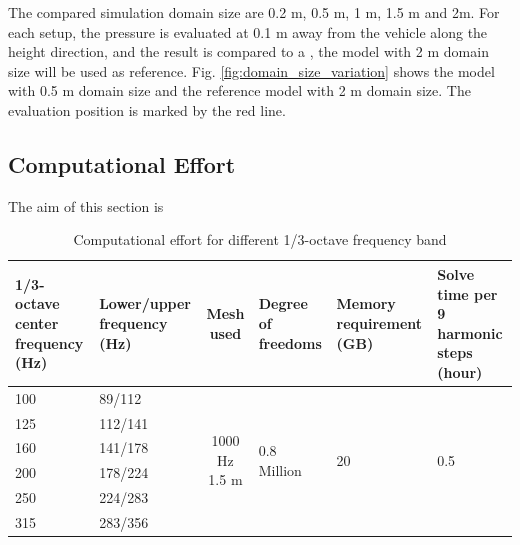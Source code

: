 The compared simulation domain size are 0.2 m, 0.5 m, 1 m, 1.5 m and 2m. For each setup, the pressure is evaluated at 0.1 m away from the vehicle along the height direction, and the result is compared to a , the model with 2 m domain size will be used as reference. Fig. \ref{fig:domain_size_variation} shows the model with 0.5 m domain size and the reference model with 2 m domain size. The evaluation position is marked by the red line.


\subsection*{Computational Effort}
The aim of this section is 

\begin{table}[H]
	\caption{Computational effort for different 1/3-octave frequency band}
	\begin{tabularx}{\textwidth}{|X|X|c|X|X|X|}
		\hline
		1/3-octave center frequency (Hz) & Lower/upper frequency (Hz) & Mesh used                       & Degree of freedoms            & Memory requirement (GB) & Solve time per 9 harmonic steps (hour) \\ \hline
		100                              & 89/112                     & \multirow{10}{*}{1000 Hz 1.5 m} & \multirow{10}{*}{0.8 Million} & \multirow{10}{*}{20}    & \multirow{10}{*}{0.5}                  \\ \cline{1-2}
		125                              & 112/141                    &                                 &                               &                         &                                        \\ \cline{1-2}
		160                              & 141/178                    &                                 &                               &                         &                                        \\ \cline{1-2}
		200                              & 178/224                    &                                 &                               &                         &                                        \\ \cline{1-2}
		250                              & 224/283                    &                                 &                               &                         &                                        \\ \cline{1-2}
		315                              & 283/356                    &                                 &                               &                         &                                        \\ \cline{1-2}

\end{tabularx}
\end{table}
